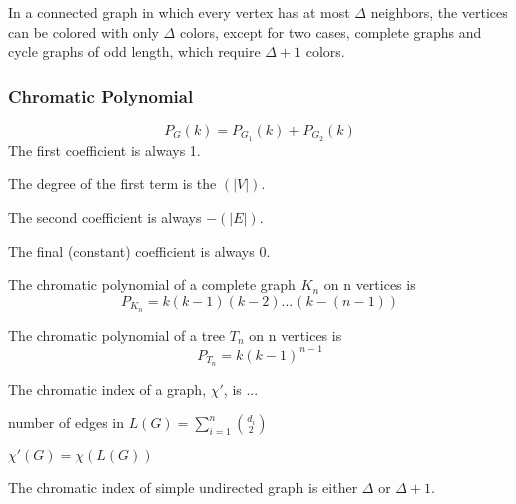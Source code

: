 

\begin{theorem}
    In a connected graph in which every vertex has at most $\Delta$ neighbors, the vertices can be colored with only $\Delta$ colors, except for two cases, complete graphs and cycle graphs of odd length, which require $\Delta+1$ colors.
\end{theorem}

\subsubsection{Chromatic Polynomial}
\[
    P_G (k) = P_{G_1} (k) + P_{G_2} (k) 
\]
The first coefficient is always 1.

The degree of the first term is the $(|V|)$.

The second coefficient is always $-(|E|)$.

The final (constant) coefficient is always 0.

\begin{definition}
    The chromatic polynomial of a complete graph $K_n$ on n vertices is 
    \[P_{K_n}=k(k-1)(k-2)...(k-(n-1))\]
\end{definition}

\begin{definition}
    The chromatic polynomial of a tree $T_n$ on n vertices is \[P_{T_n}=k(k-1)^{n-1}\]
\end{definition}



\begin{definition}
    The chromatic index of a graph, $\chi'$, is ...
\end{definition}

    number of edges in $L(G) = \sum_{i=1}^n{\binom{d_i}{2}}$

\begin{theorem}
    $\chi'(G) = \chi(L(G))$
\end{theorem}

\begin{theorem}
     The chromatic index of simple undirected graph is either $\Delta$ or $\Delta + 1$.
\end{theorem}

\begin{theorem}
\end{theorem}

